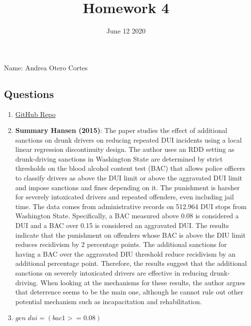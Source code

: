 \documentclass[11pt]{article}\usepackage[]{graphicx}\usepackage[]{color}
\begin{document}
\title{\textbf{Homework 4} }
\date{June 12 2020}

\maketitle

Name: Andrea Otero Cortes {\hspace{4.5cm}}



\subsection*{Questions}

\begin{enumerate} 

\item  \href{https://github.com/aoteroco/RDD}{GitHub Repo}
\item \textbf{Summary Hansen (2015)}:
\newline
 The paper studies the effect of additional sanctions on drunk drivers on reducing repeated DUI incidents using a local linear regression discontinuity design. 
 The author uses an RDD setting as drunk-driving sanctions in Washington State are determined by strict thresholds on the blood alcohol content test (BAC) that allows police officers to classify drivers as above the DUI limit or above the aggravated DUI limit and impose sanctions and fines depending on it. The punishment is harsher for severely intoxicated drivers and repeated offenders, even including jail time. The data comes from administrative records on 512.964 DUI stops from Washington State. Specifically, a BAC measured above 0.08 is considered a DUI and a BAC over 0.15 is considered an aggravated DUI.
 \newline
 The results indicate that the punishment on offenders whose BAC is above the DIU limit reduces recidivism by 2 percentage points. The additional sanctions for having a BAC over the aggravated DIU threshold reduce recidivism by an additional percentage point. Therefore, the results suggest that the additional sanctions on severely intoxicated drivers are effective in reducing drunk-driving. When looking at the mechanisms for these results, the author argues that deterrence seems to be the main one, although he cannot rule out other potential mechanism such as incapacitation and rehabilitation.
 
 \item  $gen \; dui= (bac1>=0.08)$


\end{enumerate}
\end{document}
